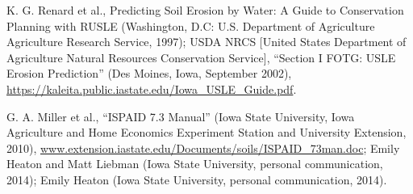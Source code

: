 \documentclass[11pt]{article}
\begin{document}
\begin{thebibliography}{1}

   K. G. Renard et al., Predicting Soil Erosion by Water: A Guide to Conservation Planning with RUSLE (Washington, D.C: U.S. Department of Agriculture Agriculture Research Service, 1997); USDA NRCS [United States Department of Agriculture Natural Resources Conservation Service], “Section I FOTG: USLE Erosion Prediction” (Des Moines, Iowa, September 2002), \url{https://kaleita.public.iastate.edu/Iowa_USLE_Guide.pdf}.

   G. A. Miller et al., “ISPAID 7.3 Manual” (Iowa State University, Iowa Agriculture and Home Economics Experiment Station and University Extension, 2010), \url{www.extension.iastate.edu/Documents/soils/ISPAID_73man.doc}; Emily Heaton and Matt Liebman (Iowa State University, personal communication, 2014); Emily Heaton (Iowa State University, personal communication, 2014).


\end{thebibliography}
\end{document}
